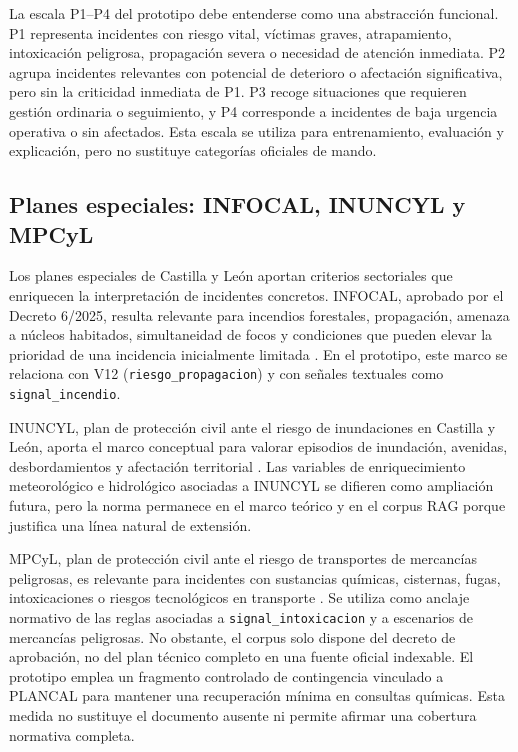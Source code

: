 La escala P1--P4 del prototipo debe entenderse como una abstracción funcional. P1 representa incidentes con riesgo vital, víctimas graves, atrapamiento, intoxicación peligrosa, propagación severa o necesidad de atención inmediata. P2 agrupa incidentes relevantes con potencial de deterioro o afectación significativa, pero sin la criticidad inmediata de P1. P3 recoge situaciones que requieren gestión ordinaria o seguimiento, y P4 corresponde a incidentes de baja urgencia operativa o sin afectados. Esta escala se utiliza para entrenamiento, evaluación y explicación, pero no sustituye categorías oficiales de mando.

\subsection{Planes especiales: INFOCAL, INUNCYL y MPCyL}

Los planes especiales de Castilla y León aportan criterios sectoriales que enriquecen la interpretación de incidentes concretos. INFOCAL, aprobado por el Decreto 6/2025, resulta relevante para incendios forestales, propagación, amenaza a núcleos habitados, simultaneidad de focos y condiciones que pueden elevar la prioridad de una incidencia inicialmente limitada \cite{INFOCAL_DEC_6_2025}. En el prototipo, este marco se relaciona con V12 (\texttt{riesgo\_propagacion}) y con señales textuales como \texttt{signal\_incendio}.

INUNCYL, plan de protección civil ante el riesgo de inundaciones en Castilla y León, aporta el marco conceptual para valorar episodios de inundación, avenidas, desbordamientos y afectación territorial \cite{INUNCYL}. Las variables de enriquecimiento meteorológico e hidrológico asociadas a INUNCYL se difieren como ampliación futura, pero la norma permanece en el marco teórico y en el corpus RAG porque justifica una línea natural de extensión.

MPCyL, plan de protección civil ante el riesgo de transportes de mercancías peligrosas, es relevante para incidentes con sustancias químicas, cisternas, fugas, intoxicaciones o riesgos tecnológicos en transporte \cite{MPCYL_ACUERDO_3_2008}. Se utiliza como anclaje normativo de las reglas asociadas a \texttt{signal\_intoxicacion} y a escenarios de mercancías peligrosas. No obstante, el corpus solo dispone del decreto de aprobación, no del plan técnico completo en una fuente oficial indexable. El prototipo emplea un fragmento controlado de contingencia vinculado a PLANCAL para mantener una recuperación mínima en consultas químicas. Esta medida no sustituye el documento ausente ni permite afirmar una cobertura normativa completa.

